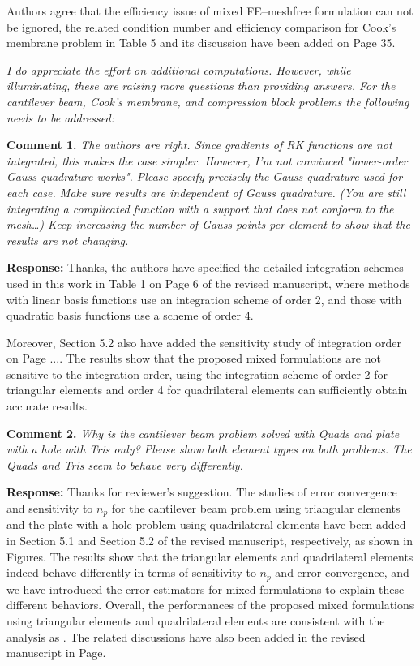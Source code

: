 \documentclass{article}
\begin{document}
Authors agree that the efficiency issue of mixed FE--meshfree formulation can not be ignored,
the related condition number and efficiency comparison for Cook's membrane problem in Table 5 and its discussion have been added on Page 35.

\textit{I do appreciate the effort on additional computations. However, while illuminating, these are raising more questions than providing answers. For the cantilever beam, Cook's membrane, and compression block problems the following needs to be addressed:}

\textbf{Comment 1.} \textit{The authors are right. Since gradients of RK functions are not integrated, this makes the case simpler. However, I'm not convinced "lower-order Gauss quadrature works". Please specify precisely the Gauss quadrature used for each case. Make sure results are independent of Gauss quadrature. (You are still integrating a complicated function with a support that does not conform to the mesh…) Keep increasing the number of Gauss points per element to show that the results are not changing.}

\textbf{Response:} 
Thanks, the authors have specified the detailed integration schemes used in this work in Table 1 on Page 6 of the revised manuscript, where methods with linear basis functions use an integration scheme of order 2, and those with quadratic basis functions use a scheme of order 4.

Moreover, Section 5.2 also have added the sensitivity study of integration order on Page ....
The results show that the proposed mixed formulations are not sensitive to the integration order, using the integration scheme of order 2 for triangular elements and order 4 for quadrilateral elements can sufficiently obtain accurate results.


\textbf{Comment 2.} \textit{Why is the cantilever beam problem solved with Quads and plate with a hole with Tris only? Please show both element types on both problems. The Quads and Tris seem to behave very differently.}

\textbf{Response:}
Thanks for reviewer's suggestion. The studies of error convergence and sensitivity to $n_p$ for the cantilever beam problem using triangular elements and the plate with a hole problem using quadrilateral elements have been added in Section 5.1 and Section 5.2 of the revised manuscript, respectively, as shown in Figures.
The results show that the triangular elements and quadrilateral elements indeed behave differently in terms of sensitivity to $n_p$ and error convergence,
and we have introduced the error estimators for mixed formulations to explain these different behaviors.
Overall, the performances of the proposed mixed formulations using triangular elements and quadrilateral elements are consistent with the analysis as .
The related discussions have also been added in the revised manuscript in Page.
\end{document}
